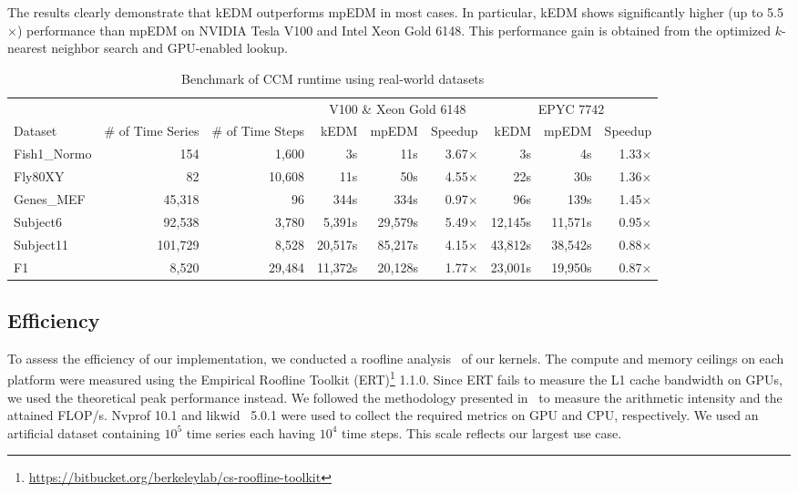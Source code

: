\documentclass[sigconf]{acmart}
\begin{document}
The results clearly demonstrate that kEDM outperforms mpEDM in most
cases. In particular, kEDM shows significantly higher (up to 5.5$\times$)
performance than mpEDM on NVIDIA Tesla V100 and Intel Xeon Gold 6148.
This performance gain is obtained from the optimized $k$-nearest neighbor search and GPU-enabled lookup.

\begin{table}
\centering
\caption{Benchmark of CCM runtime using real-world datasets}%
\label{tbl:real-world}
\begin{tabular}{@{}lrrrrrrrr@{}}
\toprule
             & \multicolumn{1}{c}{} & \multicolumn{1}{c}{} & \multicolumn{3}{c}{V100 \& Xeon Gold 6148 } & \multicolumn{3}{c}{EPYC 7742} \\ \cmidrule(l){4-6}  \cmidrule(l){7-9}
Dataset      & \multicolumn{1}{c}{\# of Time Series} & \multicolumn{1}{c}{\# of Time Steps} & kEDM & mpEDM & Speedup & kEDM & mpEDM & Speedup \\ \midrule
Fish1\_Normo &  154    & 1,600  &      3s &     11s & 3.67$\times$ &      3s &      4s & 1.33$\times$ \\
Fly80XY      &  82     & 10,608 &     11s &     50s & 4.55$\times$ &     22s &     30s & 1.36$\times$ \\
Genes\_MEF   &  45,318 & 96     &    344s &    334s & 0.97$\times$ &     96s &    139s & 1.45$\times$ \\
Subject6     &  92,538 & 3,780  &  5,391s & 29,579s & 5.49$\times$ & 12,145s & 11,571s & 0.95$\times$ \\
Subject11    & 101,729 & 8,528  & 20,517s & 85,217s & 4.15$\times$ & 43,812s & 38,542s & 0.88$\times$ \\
F1           &  8,520  & 29,484 & 11,372s & 20,128s & 1.77$\times$ & 23,001s & 19,950s & 0.87$\times$ \\ \bottomrule
\end{tabular}
\end{table}

\subsection{Efficiency}

To assess the efficiency of our implementation, we conducted a roofline
analysis~\cite{Williams2008} of our kernels. The compute and memory ceilings
on each platform were measured using the Empirical Roofline Toolkit (ERT)\footnote{\url{https://bitbucket.org/berkeleylab/cs-roofline-toolkit}} 1.1.0.
Since ERT fails to measure the L1 cache bandwidth on GPUs, we used the
theoretical peak performance instead. We followed the methodology presented
in~\cite{Yang2020a,Yang2020b} to measure the arithmetic intensity and the
attained FLOP/s. Nvprof 10.1 and likwid~\cite{Treibig2010} 5.0.1 were used to
collect the required metrics on GPU and CPU, respectively.
We used an artificial dataset containing $10^5$ time series each having $10^4$
time steps. This scale reflects our largest use case.
\end{document}
